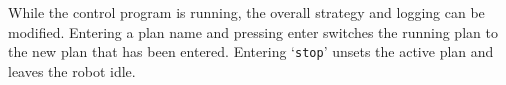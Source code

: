 \documentclass[12pt,a4paper]{article}
\begin{document}
While the control program is running, the overall strategy and logging can be modified. Entering a plan name and pressing enter switches the running plan to the new plan that has been entered. Entering `\texttt{stop}' unsets the active plan and leaves the robot idle.







\end{document}

